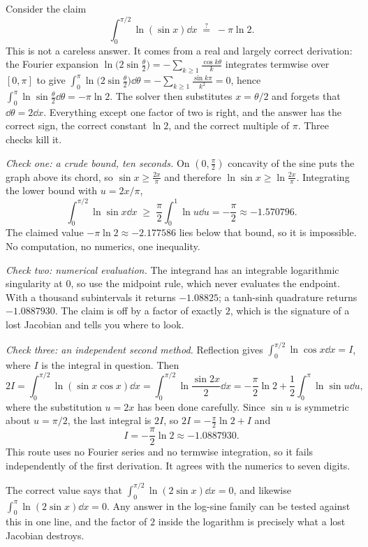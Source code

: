 Consider the claim
\[
\int_{0}^{\pi/2}\ln(\sin x)\dd x \;\overset{?}{=}\; -\pi\ln 2 .
\]
This is not a careless answer. It comes from a real and largely correct derivation: the Fourier expansion $\ln\bigl(2\sin\tfrac{\theta}{2}\bigr)=-\sum_{k\geq 1}\frac{\cos k\theta}{k}$ integrates termwise over $[0,\pi]$ to give $\int_{0}^{\pi}\ln\bigl(2\sin\tfrac{\theta}{2}\bigr)\dd\theta=-\sum_{k\geq 1}\frac{\sin k\pi}{k^{2}}=0$, hence $\int_{0}^{\pi}\ln\sin\tfrac{\theta}{2}\dd\theta=-\pi\ln 2$. The solver then substitutes $x=\theta/2$ and forgets that $\dd\theta=2\dd x$. Everything except one factor of two is right, and the answer has the correct sign, the correct constant $\ln 2$, and the correct multiple of $\pi$. Three checks kill it.

\emph{Check one: a crude bound, ten seconds.} On $(0,\tfrac{\pi}{2})$ concavity of the sine puts the graph above its chord, so $\sin x\geq \frac{2x}{\pi}$ and therefore $\ln\sin x\geq\ln\frac{2x}{\pi}$. Integrating the lower bound with $u=2x/\pi$,
\[
\int_{0}^{\pi/2}\ln\sin x\dd x\;\geq\;\frac{\pi}{2}\int_{0}^{1}\ln u\dd u=-\frac{\pi}{2}\approx -1.570796 .
\]
The claimed value $-\pi\ln 2\approx -2.177586$ lies below that bound, so it is impossible. No computation, no numerics, one inequality.

\emph{Check two: numerical evaluation.} The integrand has an integrable logarithmic singularity at $0$, so use the midpoint rule, which never evaluates the endpoint. With a thousand subintervals it returns $-1.08825$; a tanh-sinh quadrature returns $-1.0887930$. The claim is off by a factor of exactly $2$, which is the signature of a lost Jacobian and tells you where to look.

\emph{Check three: an independent second method.} Reflection gives $\int_{0}^{\pi/2}\ln\cos x\dd x=I$, where $I$ is the integral in question. Then
\[
2I=\int_{0}^{\pi/2}\ln(\sin x\cos x)\dd x=\int_{0}^{\pi/2}\ln\frac{\sin 2x}{2}\dd x=-\frac{\pi}{2}\ln 2+\frac12\int_{0}^{\pi}\ln\sin u\dd u,
\]
where the substitution $u=2x$ has been done carefully. Since $\sin u$ is symmetric about $u=\pi/2$, the last integral is $2I$, so $2I=-\frac{\pi}{2}\ln 2+I$ and
\[
I=-\frac{\pi}{2}\ln 2\approx -1.0887930 .
\]
This route uses no Fourier series and no termwise integration, so it fails independently of the first derivation. It agrees with the numerics to seven digits.

\begin{keynote}
The correct value says that $\int_{0}^{\pi/2}\ln(2\sin x)\dd x=0$, and likewise $\int_{0}^{\pi}\ln(2\sin x)\dd x=0$. Any answer in the log-sine family can be tested against this in one line, and the factor of $2$ inside the logarithm is precisely what a lost Jacobian destroys.
\end{keynote}


